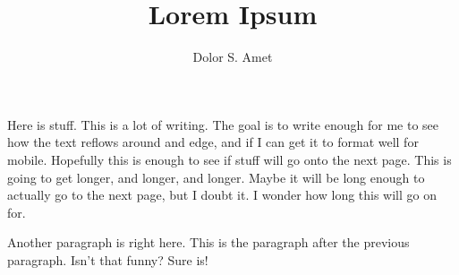 \documentclass[a6paper]{article}
\begin{document}
\title{Lorem Ipsum}
\author{Dolor S. Amet}
\maketitle
Here is stuff.  This is a lot of writing.  The goal is to write enough for me to see how the text reflows around and edge, and if I can get it to format well for mobile.  Hopefully this is enough to see if stuff will go onto the next page.  This is going to get longer, and longer, and longer.  Maybe it will be long enough to actually go to the next page, but I doubt it.  I wonder how long this will go on for.

Another paragraph is right here.  This is the paragraph after the previous paragraph.  Isn't that funny?  Sure is!
\end{document}
